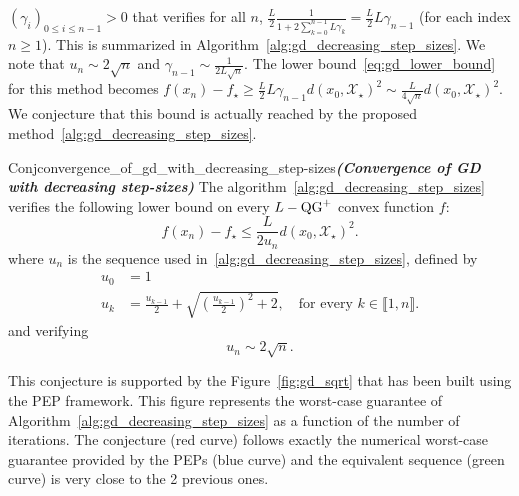         \noindent $(\gamma_i)_{0 \leq i \leq n-1}>0$ that verifies for all $n$, $\frac{L}{2}\frac{1}{1 + 2 \sum_{k=0}^{n-1} L\gamma_k} = \frac{L}{2}L\gamma_{n-1}$ (for each index $n \geq 1$).
        This is summarized in Algorithm~\ref{alg:gd_decreasing_step_sizes}.
        We note that $u_n \sim 2\sqrt{n}$ and $\gamma_{n-1} \sim \frac{1}{2L\sqrt{n}}$.
        The lower bound~\eqref{eq:gd_lower_bound} for this method becomes $f(x_n) - f_\star \geq \frac{L}{2}L\gamma_{n-1} d(x_0, \mathcal{X}_\star)^2 \sim \frac{L}{4\sqrt{n}} d(x_0, \mathcal{X}_\star)^2$.
        We conjecture that this bound is actually reached by the proposed method~\ref{alg:gd_decreasing_step_sizes}.

        \begin{restatable}{Conj}{convergence_of_gd_with_decreasing_step-sizes}\textbf{\emph{(Convergence of GD with decreasing step-sizes)}}
            \label{conj:gd_sqrt}
            The algorithm~\ref{alg:gd_decreasing_step_sizes} verifies the following lower bound on every $L-\operatorname{QG}^+$ convex function $f$:
            \begin{equation}
                f(x_n) - f_\star \leq \frac{L}{2 u_n} d(x_0, \mathcal{X}_\star)^2.
            \end{equation}
            where $u_n$ is the sequence used in~\ref{alg:gd_decreasing_step_sizes}, defined by
            \begin{align}
                u_0 & = 1 \\
                u_{k} & = \frac{u_{k-1}}{2} + \sqrt{\left(\frac{u_{k-1}}{2}\right)^2 + 2}, \quad \text{for every } k \in \llbracket 1, n \rrbracket.
            \end{align}
            and verifying
            \begin{equation}
                u_n \sim 2\sqrt{n}.
            \end{equation}
        \end{restatable}

        This conjecture is supported by the Figure~\ref{fig:gd_sqrt} that has been built using the PEP framework.
        This figure represents the worst-case guarantee of Algorithm~\ref{alg:gd_decreasing_step_sizes} as a function of the number of iterations.
        The conjecture (red curve) follows exactly the numerical worst-case guarantee provided by the PEPs (blue curve) and the equivalent sequence (green curve) is very close to the 2 previous ones.
        
